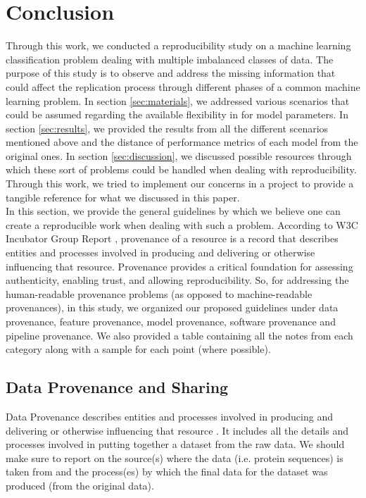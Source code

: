 \section {Conclusion}


Through this work, we conducted a reproducibility study on a machine learning classification problem dealing with multiple imbalanced 
classes of data. The purpose of this study is to observe and address the missing information that could affect the replication process  
through different phases of a common machine learning problem. In section \ref{sec:materials}, we addressed various scenarios that could 
be assumed regarding the available flexibility in \cite{mishra2014prediction} for model parameters. In section \ref{sec:results}, we 
provided the results from all the different scenarios mentioned above and the distance of performance metrics of each model 
from the original ones. In section \ref{sec:discussion}, we discussed possible resources 
through which these sort of problems could be handled when dealing with reproducibility. 
Through this work, we tried to implement our concerns in a project to provide a tangible reference for what we discussed in this paper.\\ 

In this section, we provide the general guidelines by which we believe one can create a reproducible work when dealing with such a problem. 
According to W3C Incubator Group Report \cite{w3c}, provenance of a resource is a record that describes entities and processes involved 
in producing and delivering or otherwise influencing that resource. 
Provenance provides a critical foundation for assessing authenticity, enabling trust, 
and allowing reproducibility. So, for addressing the human-readable provenance problems (as opposed to machine-readable provenances), 
in this study, we organized our proposed guidelines under data provenance, feature provenance, model provenance, software provenance 
and pipeline provenance. We also provided a table containing all the notes from each category along with a sample for each point 
(where possible).\\ 

\subsection{Data Provenance and Sharing}
    Data Provenance describes entities and processes involved in producing and delivering or otherwise influencing 
    that resource \cite{w3c}. It includes all the details and processes involved in putting together a dataset from the raw data. 
    We should make sure to report on the source(s) where the data (i.e. protein sequences) is taken from and the process(es) 
    by which the final data for the dataset was produced (from the original data). \\
    
